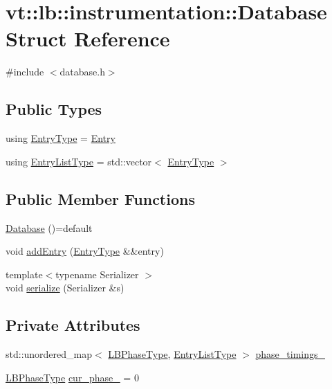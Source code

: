 \hypertarget{structvt_1_1lb_1_1instrumentation_1_1_database}{}\section{vt\+:\+:lb\+:\+:instrumentation\+:\+:Database Struct Reference}
\label{structvt_1_1lb_1_1instrumentation_1_1_database}


{\ttfamily \#include $<$database.\+h$>$}

\subsection*{Public Types}
\begin{DoxyCompactItemize}
\item 
using \hyperlink{structvt_1_1lb_1_1instrumentation_1_1_database_ab04e7d7099af7dd33f4ac1594f8cde32}{Entry\+Type} = \hyperlink{structvt_1_1lb_1_1instrumentation_1_1_entry}{Entry}
\item 
using \hyperlink{structvt_1_1lb_1_1instrumentation_1_1_database_af27c1e929c54fd378f84978cbe9360a7}{Entry\+List\+Type} = std\+::vector$<$ \hyperlink{structvt_1_1lb_1_1instrumentation_1_1_database_ab04e7d7099af7dd33f4ac1594f8cde32}{Entry\+Type} $>$
\end{DoxyCompactItemize}
\subsection*{Public Member Functions}
\begin{DoxyCompactItemize}
\item 
\hyperlink{structvt_1_1lb_1_1instrumentation_1_1_database_a4daabff0a0a252f62b7ae0a7089be1bb}{Database} ()=default
\item 
void \hyperlink{structvt_1_1lb_1_1instrumentation_1_1_database_ab9bf31b95d1c80bbe02268cd9689d453}{add\+Entry} (\hyperlink{structvt_1_1lb_1_1instrumentation_1_1_database_ab04e7d7099af7dd33f4ac1594f8cde32}{Entry\+Type} \&\&entry)
\item 
{\footnotesize template$<$typename Serializer $>$ }\\void \hyperlink{structvt_1_1lb_1_1instrumentation_1_1_database_a7e7970fb706eaf6b1f1123d5a79120d0}{serialize} (Serializer \&s)
\end{DoxyCompactItemize}
\subsection*{Private Attributes}
\begin{DoxyCompactItemize}
\item 
std\+::unordered\+\_\+map$<$ \hyperlink{namespacevt_a5505d0bab25ce2ff566a8e015871b379}{L\+B\+Phase\+Type}, \hyperlink{structvt_1_1lb_1_1instrumentation_1_1_database_af27c1e929c54fd378f84978cbe9360a7}{Entry\+List\+Type} $>$ \hyperlink{structvt_1_1lb_1_1instrumentation_1_1_database_ab19c0b8e6af9cd204eddc1c1ce4710eb}{phase\+\_\+timings\+\_\+}
\item 
\hyperlink{namespacevt_a5505d0bab25ce2ff566a8e015871b379}{L\+B\+Phase\+Type} \hyperlink{structvt_1_1lb_1_1instrumentation_1_1_database_accff0a340e53d9456af09f1e2751e561}{cur\+\_\+phase\+\_\+} = 0
\end{DoxyCompactItemize}
